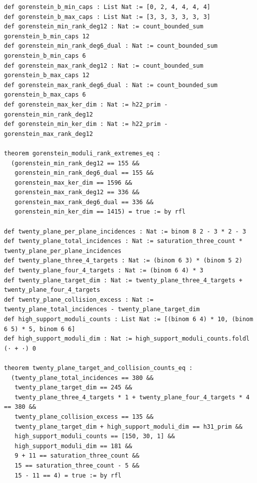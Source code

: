 \documentclass[11pt,a4paper]{article}
\begin{document}
\begin{lstlisting}[caption={Recombination kernel gain, universal cancellation bounds, Gorenstein extremes, and $20$-plane collision counts in \texttt{HodgeVerification.lean}.}]
def gorenstein_b_min_caps : List Nat := [0, 2, 4, 4, 4, 4]
def gorenstein_b_max_caps : List Nat := [3, 3, 3, 3, 3, 3]
def gorenstein_min_rank_deg12 : Nat := count_bounded_sum gorenstein_b_min_caps 12
def gorenstein_min_rank_deg6_dual : Nat := count_bounded_sum gorenstein_b_min_caps 6
def gorenstein_max_rank_deg12 : Nat := count_bounded_sum gorenstein_b_max_caps 12
def gorenstein_max_rank_deg6_dual : Nat := count_bounded_sum gorenstein_b_max_caps 6
def gorenstein_max_ker_dim : Nat := h22_prim - gorenstein_min_rank_deg12
def gorenstein_min_ker_dim : Nat := h22_prim - gorenstein_max_rank_deg12

theorem gorenstein_moduli_rank_extremes_eq :
  (gorenstein_min_rank_deg12 == 155 &&
   gorenstein_min_rank_deg6_dual == 155 &&
   gorenstein_max_ker_dim == 1596 &&
   gorenstein_max_rank_deg12 == 336 &&
   gorenstein_max_rank_deg6_dual == 336 &&
   gorenstein_min_ker_dim == 1415) = true := by rfl

def twenty_plane_per_plane_incidences : Nat := binom 8 2 - 3 * 2 - 3
def twenty_plane_total_incidences : Nat := saturation_three_count * twenty_plane_per_plane_incidences
def twenty_plane_three_4_targets : Nat := (binom 6 3) * (binom 5 2)
def twenty_plane_four_4_targets : Nat := (binom 6 4) * 3
def twenty_plane_target_dim : Nat := twenty_plane_three_4_targets + twenty_plane_four_4_targets
def twenty_plane_collision_excess : Nat := twenty_plane_total_incidences - twenty_plane_target_dim
def high_support_moduli_counts : List Nat := [(binom 6 4) * 10, (binom 6 5) * 5, binom 6 6]
def high_support_moduli_dim : Nat := high_support_moduli_counts.foldl (· + ·) 0

theorem twenty_plane_target_and_collision_counts_eq :
  (twenty_plane_total_incidences == 380 &&
   twenty_plane_target_dim == 245 &&
   twenty_plane_three_4_targets * 1 + twenty_plane_four_4_targets * 4 == 380 &&
   twenty_plane_collision_excess == 135 &&
   twenty_plane_target_dim + high_support_moduli_dim == h31_prim &&
   high_support_moduli_counts == [150, 30, 1] &&
   high_support_moduli_dim == 181 &&
   9 + 11 == saturation_three_count &&
   15 == saturation_three_count - 5 &&
   15 - 11 == 4) = true := by rfl
\end{lstlisting}
\end{document}
